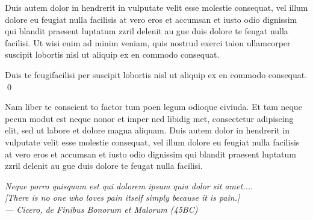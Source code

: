 \documentclass[12pt]{report}
\begin{document}
Duis autem dolor in hendrerit in vulputate velit esse molestie
consequat, vel illum dolore eu feugiat nulla facilisis at vero eros et
accumsan et iusto odio dignissim qui blandit praesent luptatum zzril
delenit au gue duis dolore te feugat nulla facilisi.  Ut wisi enim ad
minim veniam, quis nostrud exerci taion ullamcorper suscipit lobortis
nisl ut aliquip ex en commodo consequat. 

\begin{corollary}
Duis te feugifacilisi per suscipit lobortis nisl ut aliquip ex en
commodo consequat. \qed
\end{corollary}

Nam liber te conscient to factor tum poen legum odioque civiuda.  Et
tam neque pecun modut est neque nonor et imper ned libidig met,
consectetur adipiscing elit, sed ut labore et dolore magna aliquam.
Duis autem dolor in hendrerit in vulputate velit esse molestie
consequat, vel illum dolore eu feugiat nulla facilisis at vero eros et
accumsan et iusto odio dignissim qui blandit praesent luptatum zzril
delenit au gue duis dolore te feugat nulla facilisi.

\vfill
\begin{flushright}\small\sffamily\slshape
Neque porro quisquam est qui dolorem ipsum quia dolor sit amet....\\{}
[There is no one who loves pain itself simply because it is pain.]\\
\textup{--- Cicero, \textsl{de Finibus Bonorum et Malorum} (45BC)}
\end{flushright}
\end{document}
